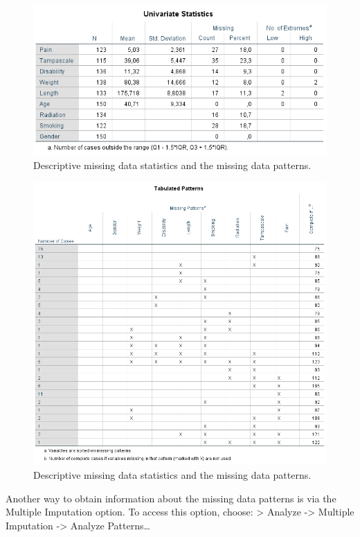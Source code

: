 \documentclass[]{book}
\theoremstyle{definition}
\theoremstyle{definition}
\theoremstyle{definition}
\theoremstyle{remark}
\begin{document}
\begin{figure}

{\centering \includegraphics[width=0.9\linewidth]{images/tab2.1a} 

}

\caption{Descriptive missing data statistics and the missing data patterns.}\label{fig:tab2-1}
\end{figure}\begin{figure}

{\centering \includegraphics[width=0.9\linewidth]{images/tab2.1b} 

}

\caption{Descriptive missing data statistics and the missing data patterns.}\label{fig:tab2-1}
\end{figure}

Another way to obtain information about the missing data patterns is via
the Multiple Imputation option. To access this option, choose:
\textgreater{} Analyze -\textgreater{} Multiple Imputation
-\textgreater{} Analyze Patterns\ldots{}
\end{document}
